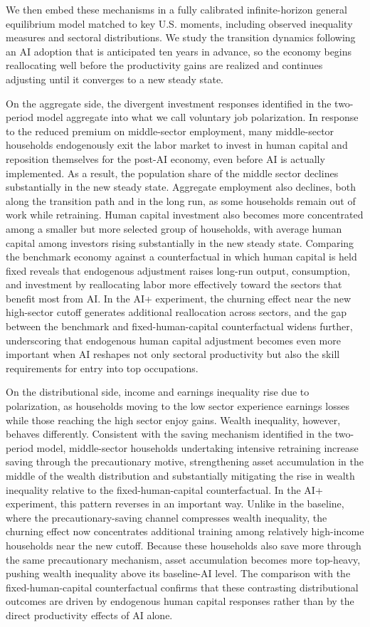 \documentclass[12pt,english]{article}
\numberwithin{equation}{section}
\begin{document}
We then embed these mechanisms in a fully calibrated infinite-horizon general equilibrium model matched to key U.S. moments, including observed inequality measures and sectoral distributions. We study the transition dynamics following an AI adoption that is anticipated ten years in advance, so the economy begins reallocating well before the productivity gains are realized and continues adjusting until it converges to a new steady state. 

On the aggregate side, the divergent investment responses identified in the two-period model aggregate into what we call voluntary job polarization. In response to the reduced premium on middle-sector employment, many middle-sector households endogenously exit the labor market to invest in human capital and reposition themselves for the post-AI economy, even before AI is actually implemented. As a result, the population share of the middle sector declines substantially in the new steady state. Aggregate employment also declines, both along the transition path and in the long run, as some households remain out of work while retraining. Human capital investment also becomes more concentrated among a smaller but more selected group of households, with average human capital among investors rising substantially in the new steady state. Comparing the benchmark economy against a counterfactual in which human capital is held fixed reveals that endogenous adjustment raises long-run output, consumption, and investment by reallocating labor more effectively toward the sectors that benefit most from AI. In the AI+ experiment, the churning effect near the new high-sector cutoff generates additional reallocation across sectors, and the gap between the benchmark and fixed-human-capital counterfactual widens further, underscoring that endogenous human capital adjustment becomes even more important when AI reshapes not only sectoral productivity but also the skill requirements for entry into top occupations.

On the distributional side, income and earnings inequality rise due to polarization, as households moving to the low sector experience earnings losses while those reaching the high sector enjoy gains. Wealth inequality, however, behaves differently. Consistent with the saving mechanism identified in the two-period model, middle-sector households undertaking intensive retraining increase saving through the precautionary motive, strengthening asset accumulation in the middle of the wealth distribution and substantially mitigating the rise in wealth inequality relative to the fixed-human-capital counterfactual. In the AI+ experiment, this pattern reverses in an important way. Unlike in the baseline, where the precautionary-saving channel compresses wealth inequality, the churning effect now concentrates additional training among relatively high-income households near the new cutoff. Because these households also save more through the same precautionary mechanism, asset accumulation becomes more top-heavy, pushing wealth inequality above its baseline-AI level. The comparison with the fixed-human-capital counterfactual confirms that these contrasting distributional outcomes are driven by endogenous human capital responses rather than by the direct productivity effects of AI alone. 
\end{document}
